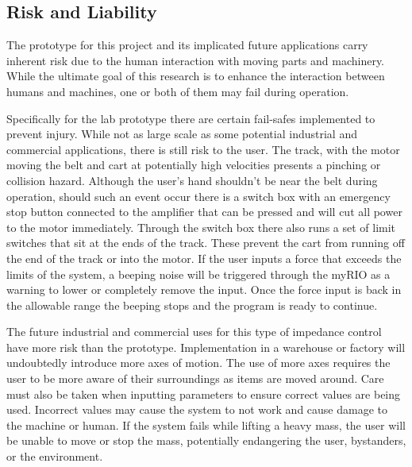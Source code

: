 \subsection*{Risk and Liability}
The prototype for this project and its implicated future applications carry inherent risk due to the human interaction with moving parts and machinery. While the ultimate goal of this research is to enhance the interaction between humans and machines, one or both of them may fail during operation.

Specifically for the lab prototype there are certain fail-safes implemented to prevent injury. While not as large scale as some potential industrial and commercial applications, there is still risk to the user. The track, with the motor moving the belt and cart at potentially high velocities presents a pinching or collision hazard. Although the user's hand shouldn't be near the belt during operation, should such an event occur there is a switch box with an emergency stop button connected to the amplifier that can be pressed and will cut all power to the motor immediately. Through the switch box there also runs a set of limit switches that sit at the ends of the track. These prevent the cart from running off the end of the track or into the motor. If the user inputs a force that exceeds the limits of the system, a beeping noise will be triggered through the myRIO as a warning to lower or completely remove the input. Once the force input is back in the allowable range the beeping stops and the program is ready to continue.

The future industrial and commercial uses for this type of impedance control have more risk than the prototype. Implementation in a warehouse or factory will undoubtedly introduce more axes of motion. The use of more axes requires the user to be more aware of their surroundings as items are moved around. Care must also be taken when inputting parameters to ensure correct values are being used. Incorrect values may cause the system to not work and cause damage to the machine or human. If the system fails while lifting a heavy mass, the user will be unable to move or stop the mass, potentially endangering the user, bystanders, or the environment.
